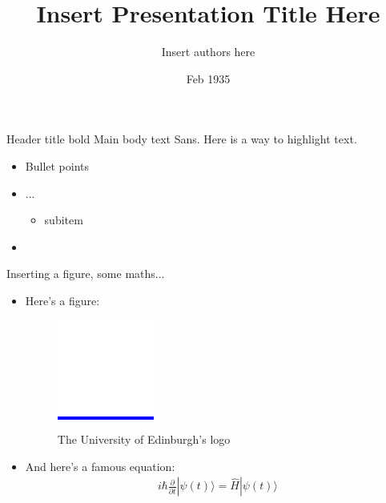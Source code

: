 \documentclass{beamer}
\title[Insert Title (short version of title)]{Insert Presentation Title Here}
\author{Insert authors here}
\date{Feb 1935}
\begin{document}
\begin{frame}
  \titlepage
\end{frame}

\begin{frame}[t]{Header title bold}
  Main body text Sans. Here is a way to \alert{highlight text}.
  \label{sec:Test1}
  \begin{itemize}
  \item Bullet points
  \item ...
    \begin{itemize}
    \item subitem
    \end{itemize}
  \item \lipsum[2]
  \end{itemize}
\end{frame}



\begin{frame}{Inserting a figure, some maths...}
  \begin{itemize}
  \item   Here's a figure:
    \begin{figure}[h]
      \centering
      \colorbox{blue}{\includegraphics[width=.13\linewidth]{edinburgh-logo}}
      \caption{The University of Edinburgh's logo}
      \label{fig:edinburgh-logo}
    \end{figure}
  \item 
    And here's a famous equation:
  \begin{eqnarray}
    \label{eq:schroedinger}
    i\hbar {\frac {\partial }{\partial t}}|\psi (t)\rangle ={\hat {H}}|\psi (t)\rangle
  \end{eqnarray}
  \end{itemize}
\end{frame}
\end{document}
